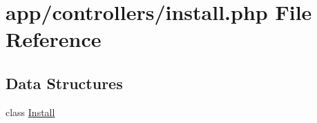 \hypertarget{controllers_2install_8php}{}\section{app/controllers/install.php File Reference}
\label{controllers_2install_8php}
\subsection*{Data Structures}
\begin{DoxyCompactItemize}
\item 
class \hyperlink{classInstall}{Install}
\end{DoxyCompactItemize}

